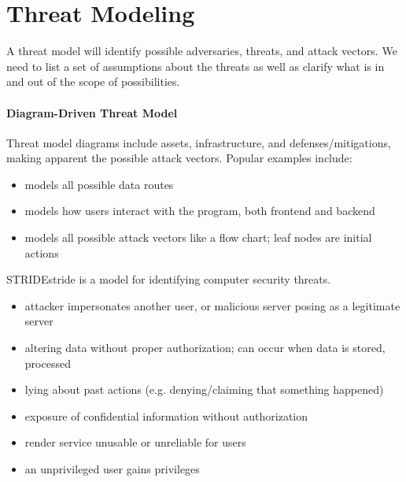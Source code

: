 \documentclass[12pt]{report}
\begin{document}
\section{Threat Modeling}
A threat model will identify possible adversaries, threats, and attack vectors. We need to list a set of assumptions about the threats as well as clarify what is in and out of the scope of possibilities.

\paragraph{Diagram-Driven Threat Model}
Threat model diagrams include assets, infrastructure, and defenses/mitigations, making apparent the possible attack vectors. Popular examples include:
\begin{itemize}[noitemsep]
    \item {} models all possible data routes
    \item {} models how users interact with the program, both frontend and backend
    \item {} models all possible attack vectors like a flow chart; leaf nodes are initial actions
\end{itemize}

\begin{dfnbox}{STRIDE}{stride}
     is a model for identifying computer security threats.
    \begin{itemize}[noitemsep]
        \item {} attacker impersonates another user, or malicious server posing as a legitimate server
        \item {} altering data without proper authorization; can occur when data is stored, processed
        \item {} lying about past actions (e.g. denying/claiming that something happened)
        \item {} exposure of confidential information without authorization
        \item {} render service unusable or unreliable for users
        \item {} an unprivileged user gains privileges
    \end{itemize}
\end{dfnbox}
\end{document}
